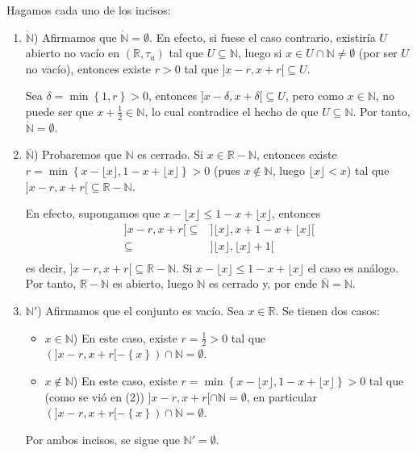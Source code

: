 \documentclass[12pt]{report}
\theoremstyle{largebreak}
\newcommand{\Int}[1]{\ensuremath{\mathring{#1}}}
\newcommand{\Cls}[1]{\ensuremath{\overline{#1}}}
\newcommand{\floor}[1]{\ensuremath{\lfloor#1\rfloor}}
\begin{document}
    \begin{sol}
        Hagamos cada uno de los incisos:
        \begin{enumerate}
            \item $\Int{\mathbb{N}}$) Afirmamos que $\Int{\mathbb{N}}=\emptyset$. En efecto, si fuese el caso contrario, existiría $U$ abierto no vacío en $(\mathbb{R},\tau_u)$ tal que $U\subseteq\mathbb{N}$, luego si $x\in U\cap\mathbb{N}\neq\emptyset$ (por ser $U$ no vacío), entonces existe $r>0$ tal que $]x-r,x+r[\subseteq U$.
            
            Sea $\delta=\min\left\{1,r\right\}>0$, entonces $]x-\delta,x+\delta[\subseteq U$, pero como $x\in\mathbb{N}$, no puede ser que $x+\frac{1}{2}\in\mathbb{N}$, lo cual contradice el hecho de que $U\subseteq\mathbb{N}$. Por tanto, $\Int{\mathbb{N}}=\emptyset$.
            \item $\Cls{\mathbb{N}}$) Probaremos que $\mathbb{N}$ es cerrado. Si $x\in\mathbb{R}-\mathbb{N}$, entonces existe $r=\min\left\{x-\floor{x},1-x+\floor{x}\right\}>0$ (pues $x\notin\mathbb{N}$, luego $\floor{x}<x$) tal que $]x-r,x+r[\subseteq\mathbb{R}-\mathbb{N}$. 
            
            En efecto, supongamos que $x-\floor{x}\leq1-x+\floor{x}$, entonces
            \begin{equation*}
                \begin{split}
                    ]x-r,x+r[\subseteq &]\floor{x},x+1-x+\floor{x}[ \\
                    \subseteq &]\floor{x},\floor{x}+1[ \\
                \end{split}
            \end{equation*}
            es decir, $]x-r,x+r[\subseteq\mathbb{R}-\mathbb{N}$. Si $x-\floor{x}\leq1-x+\floor{x}$ el caso es análogo. Por tanto, $\mathbb{R}-\mathbb{N}$ es abierto, luego $\mathbb{N}$ es cerrado y, por ende $\Cls{\mathbb{N}}=\mathbb{N}$.

            \item $\mathbb{N}'$) Afirmamos que el conjunto es vacío. Sea $x\in\mathbb{R}$. Se tienen dos casos:
            \begin{itemize}
                \item $x\in\mathbb{N}$) En este caso, existe $r=\frac{1}{2}>0$ tal que $(]x-r,x+r[-\left\{x\right\})\cap\mathbb{N}=\emptyset$.
                \item $x\notin\mathbb{N}$) En este caso, existe $r=\min\left\{x-\floor{x},1-x+\floor{x}\right\}>0$ tal que (como se vió en (2)) $]x-r,x+r[\cap\mathbb{N}=\emptyset$, en particular $(]x-r,x+r[-\left\{x\right\})\cap\mathbb{N}=\emptyset$.
            \end{itemize}
            Por ambos incisos, se sigue que $\mathbb{N}'=\emptyset$.


\end{enumerate}
\end{sol}
\end{document}
